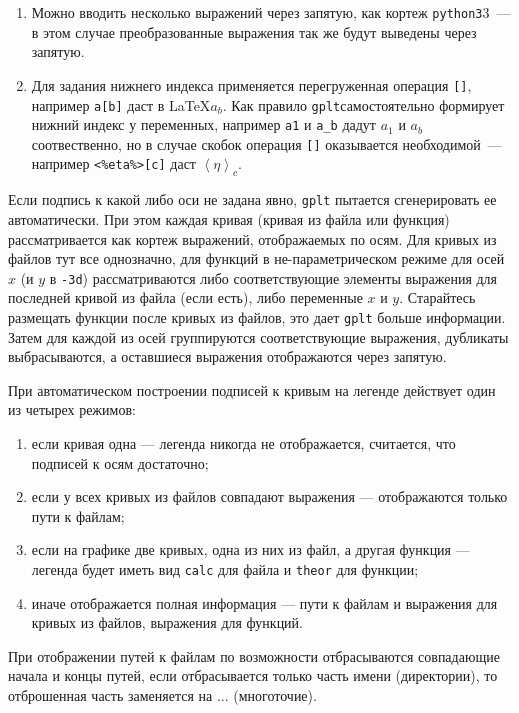 \documentclass[12pt]{article}
\def\gplt{{\tt gplt}}
\def\python{{\tt python3}}
\begin{document}
\begin{enumerate}
\item Можно вводить несколько выражений через запятую, как кортеж \python3~--- в этом случае преобразованные выражения так же будут выведены через запятую.
\item Для задания нижнего индекса применяется перегруженная операция \verb'[]', например \verb'a[b]' даст в \LaTeX $a_b$.
  Как правило \gplt самостоятельно формирует нижний индекс у переменных, например \verb'a1' и \verb'a_b' дадут $a_1$ и $a_b$ соотвественно,
  но в случае скобок операция \verb'[]' оказывается необходимой~--- например \verb'<%eta%>[c]' даст $\left<\eta\right>_c$.
\end{enumerate}

Если подпись к какой либо оси не задана явно, \gplt{} пытается сгенерировать ее автоматически.
При этом каждая кривая (кривая из файла или функция) рассматривается как кортеж выражений, отображаемых по осям.
Для кривых из файлов тут все однозначно, для функций в не-параметрическом режиме для осей $x$ (и $y$ в \verb'-3d')
рассматриваются либо соответствующие элементы выражения для последней кривой из файла (если есть), либо 
переменные $x$ и $y$. Старайтесь размещать функции после кривых из файлов, это дает \gplt{} больше информации.
Затем для каждой из осей группируются соответствующие выражения, дубликаты выбрасываются, а оставшиеся выражения отображаются через запятую.

При автоматическом построении подписей к кривым на легенде действует один из четырех режимов:
\begin{enumerate}
\item если кривая одна --- легенда никогда не отображается, считается, что подписей к осям достаточно;
\item если у всех кривых из файлов совпадают выражения --- отображаются только пути к файлам;
\item если на графике две кривых, одна из них из файл, а другая функция --- легенда будет иметь вид \verb'calc' для файла и \verb'theor' для функции;
\item иначе отображается полная информация --- пути к файлам и выражения для кривых из файлов, выражения для функций.
\end{enumerate}
При отображении путей к файлам по возможности отбрасываются совпадающие начала и концы путей, если отбрасывается только часть имени (директории),
то отброшенная часть заменяется на ...
(многоточие).
\end{document}
